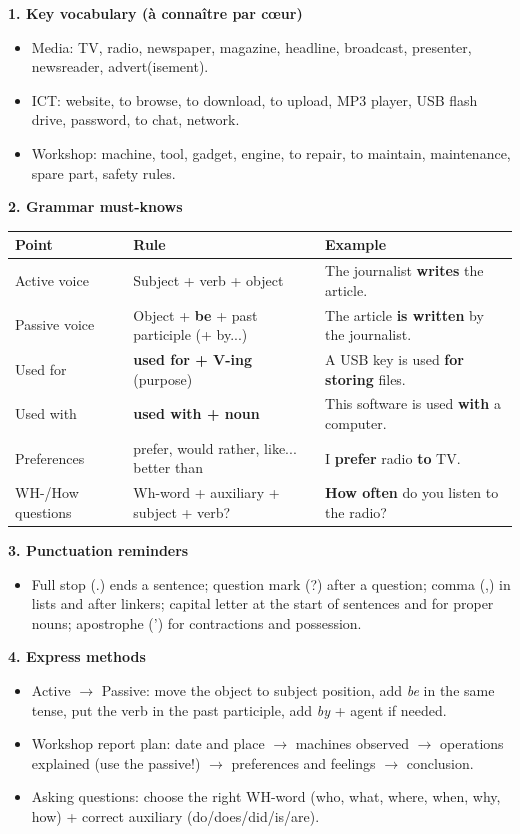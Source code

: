 \documentclass[11pt]{article}
\newcommand{\cle}[1]{{\popxbold\color{popdark}#1}}
\begin{document}
\begin{bilan}
\textbf{1. Key vocabulary (à connaître par cœur)}
\begin{itemize}
\item \cle{Media}: TV, radio, newspaper, magazine, headline, broadcast, presenter, newsreader, advert(isement).
\item \cle{ICT}: website, to browse, to download, to upload, MP3 player, USB flash drive, password, to chat, network.
\item \cle{Workshop}: machine, tool, gadget, engine, to repair, to maintain, maintenance, spare part, safety rules.
\end{itemize}

\textbf{2. Grammar must-knows}
\begin{center}
\begin{tabularx}{\linewidth}{|l|X|X|}\hline
\rowcolor{popblueL} \textbf{Point} & \textbf{Rule} & \textbf{Example} \\ \hline
Active voice & Subject + verb + object & The journalist \textbf{writes} the article. \\ \hline
Passive voice & Object + \textbf{be} + past participle (+ by...) & The article \textbf{is written} by the journalist. \\ \hline
Used for & \textbf{used for + V-ing} (purpose) & A USB key is used \textbf{for storing} files. \\ \hline
Used with & \textbf{used with + noun} & This software is used \textbf{with} a computer. \\ \hline
Preferences & prefer, would rather, like... better than & I \textbf{prefer} radio \textbf{to} TV. \\ \hline
WH-/How questions & Wh-word + auxiliary + subject + verb? & \textbf{How often} do you listen to the radio? \\ \hline
\end{tabularx}
\end{center}

\textbf{3. Punctuation reminders}
\begin{itemize}
\item Full stop (.) ends a sentence; question mark (?) after a question; comma (,) in lists and after linkers; capital letter at the start of sentences and for proper nouns; apostrophe (') for contractions and possession.
\end{itemize}

\textbf{4. Express methods}
\begin{itemize}
\item \cle{Active $\rightarrow$ Passive}: move the object to subject position, add \emph{be} in the same tense, put the verb in the past participle, add \emph{by} + agent if needed.
\item \cle{Workshop report plan}: date and place $\rightarrow$ machines observed $\rightarrow$ operations explained (use the passive!) $\rightarrow$ preferences and feelings $\rightarrow$ conclusion.
\item \cle{Asking questions}: choose the right WH-word (who, what, where, when, why, how) + correct auxiliary (do/does/did/is/are).
\end{itemize}
\end{bilan}
\end{document}

